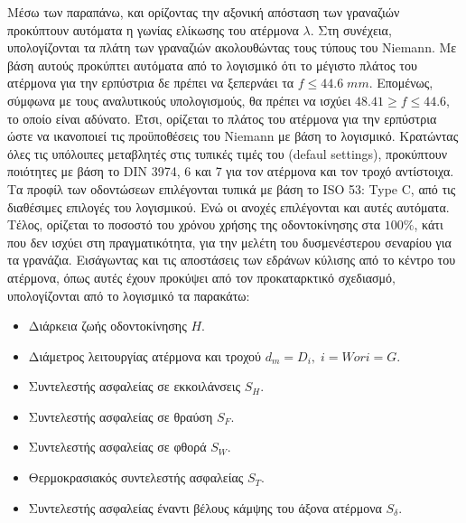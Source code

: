 Μέσω των παραπάνω, και ορίζοντας την αξονική απόσταση των γραναζιών προκύπτουν αυτόματα η γωνίας ελίκωσης του ατέρμονα $\lambda$. Στη συνέχεια, υπολογίζονται τα πλάτη των γραναζιών ακολουθώντας τους τύπους του Niemann. Με βάση αυτούς προκύπτει αυτόματα από το λογισμικό ότι το μέγιστο πλάτος του ατέρμονα για την ερπύστρια δε πρέπει να ξεπερνάει τα $f \le 44.6\; mm$. Επομένως, σύμφωνα με τους αναλυτικούς υπολογισμούς, θα πρέπει να ισχύει $48.41 \ge f \le 44.6$, το οποίο είναι αδύνατο. Έτσι, ορίζεται το πλάτος του ατέρμονα για την ερπύστρια ώστε να ικανοποιεί τις προϋποθέσεις του Niemann με βάση το λογισμικό. Κρατώντας όλες τις υπόλοιπες μεταβλητές στις τυπικές τιμές του (defaul settings), προκύπτουν ποιότητες με βάση το DIN 3974, 6 και 7 για τον ατέρμονα και τον τροχό αντίστοιχα. Τα προφίλ των οδοντώσεων επιλέγονται τυπικά με βάση το ISO 53: Type C, από τις διαθέσιμες επιλογές του λογισμικού. Ενώ οι ανοχές επιλέγονται και αυτές αυτόματα. Τέλος, ορίζεται το ποσοστό του χρόνου χρήσης της οδοντοκίνησης στα $100\%$, κάτι που δεν ισχύει στη πραγματικότητα, για την μελέτη του δυσμενέστερου σεναρίου για τα γρανάζια. Εισάγωντας και τις αποστάσεις των εδράνων κύλισης από το κέντρο του ατέρμονα, όπως αυτές έχουν προκύψει από τον προκαταρκτικό σχεδιασμό, υπολογίζονται από το λογισμικό τα παρακάτω:
\begin{itemize}
    \item Διάρκεια ζωής οδοντοκίνησης $H$.
    \item Διάμετρος λειτουργίας ατέρμονα και τροχού $d_m = D_i,\; i = W or i = G$.
    \item Συντελεστής ασφαλείας σε εκκοιλάνσεις $S_H$.
    \item Συντελεστής ασφαλείας σε θραύση $S_F$.
    \item Συντελεστής ασφαλείας σε φθορά $S_W$.
    \item Θερμοκρασιακός συντελεστής ασφαλείας $S_T$.
    \item Συντελεστής ασφαλείας έναντι βέλους κάμψης του άξονα ατέρμονα $S_\delta$.
\end{itemize}

